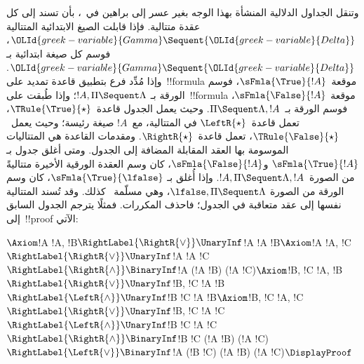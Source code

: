 \documentclass[../../../include/open-logic-section]{subfiles}
\begin{document}
وتنقل الجداول الدلالية المنشأة بهذا الوجه بغير عسر إلى براهين في~،
بأن تسند إلى كل عقدة متتالية. فإذا قابلت الصيغ الابتدائية المتتالية
${\OLId{greek-variable}{Gamma}}\Sequent{\OLId{greek-variable}{Delta}}$، فوسم كل صيغة ابتدائية بـ
${\OLId{greek-variable}{Gamma}}\Sequent{\OLId{greek-variable}{Delta}}$. وإذا مُدِّد فرع بتطبيق قاعدة تمديد على~!!{formula}
موقعة~$\sFmla{\True}{!A}$، فوسم الورقة بـ
$!A,\Pi\Sequent\Lambda$؛ وإذا طُبقت على~!!{formula} موقعة
$\sFmla{\False}{!A}$، فوسم الورقة بـ~$\Pi\Sequent\Lambda,!A$. وحيث يعمل
الجدول قاعدة~$\TRule{\True}{\star}$، تعمل قاعدة~$\LeftR{\star}$ في
المتتالية، مع~$!A$ صيغة رئيسة؛ وحيث يعمل~$\TRule{\False}{\star}$، تعمل
قاعدة~$\RightR{\star}$. ومقدمات القاعدة هي المتتاليات الموسومة بها العقد
المقابلة المضافة إلى الجدول. ومتى أغلق جدول بـ
$\sFmla{\True}{!A}$ و$\sFmla{\False}{!A}$، كان وسم العقدة الورقية الأخيرة
متتاليةً من الصورة~$!A,\Pi\Sequent\Lambda,!A$. وإذا أُغلق بـ
$\sFmla{\True}{\lfalse}$، كان وسم الورقة من الصورة
$\lfalse,\Pi\Sequent\Lambda$، وهي مسلّمة~ كذلك. وقد تُسند
المتتالية نفسها إلى عقد متعاقبة في الجدول؛ فاحذف المكررات. فمثلًا يترجم
الجدول السابق إلى~!!{proof} الآتي:
\begin{maxwidth}
$
\Axiom$!A \fCenter !A, !B$
\RightLabel{\RightR{\lor}}
\UnaryInf$!A \fCenter !A \lor !B$
\Axiom$!A \fCenter !A, !C$
\RightLabel{\RightR{\lor}}
\UnaryInf$!A \fCenter !A \lor !C$
\RightLabel{\RightR{\land}}
\BinaryInf$!A \fCenter (!A \lor !B) \land (!A \lor !C)$
\Axiom$!B, !C \fCenter !A, !B$
\RightLabel{\RightR{\lor}}
\UnaryInf$!B, !C \fCenter !A \lor !B$
\RightLabel{\LeftR{\land}}
\UnaryInf$!B \land !C \fCenter !A \lor !B$
\Axiom$!B, !C \fCenter !A, !C$
\RightLabel{\RightR{\lor}}
\UnaryInf$!B, !C \fCenter !A \lor !C$
\RightLabel{\LeftR{\land}}
\UnaryInf$!B \land !C \fCenter !A \lor !C$
\RightLabel{\RightR{\land}}
\BinaryInf$!B \land !C \fCenter (!A \lor !B) \land
(!A \lor !C)$
\RightLabel{\LeftR{\lor}}
\BinaryInf$!A \lor (!B \land !C) \fCenter (!A \lor !B) \land
(!A \lor !C)$
\DisplayProof$
\end{maxwidth}
\end{document}
